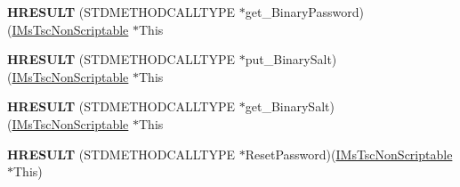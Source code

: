 \begin{DoxyCompactItemize}
{\bfseries H\+R\+E\+S\+U\+LT} (S\+T\+D\+M\+E\+T\+H\+O\+D\+C\+A\+L\+L\+T\+Y\+PE $\ast$get\+\_\+\+Binary\+Password)(\hyperlink{interface_m_s_t_s_c_lib_1_1_i_ms_tsc_non_scriptable}{I\+Ms\+Tsc\+Non\+Scriptable} $\ast$This
\item 
\mbox{\label{struct_m_s_t_s_c_lib_1_1_i_ms_tsc_non_scriptable_vtbl_aa35deec1a31aa10a48491b89ff4978c8}} 
{\bfseries H\+R\+E\+S\+U\+LT} (S\+T\+D\+M\+E\+T\+H\+O\+D\+C\+A\+L\+L\+T\+Y\+PE $\ast$put\+\_\+\+Binary\+Salt)(\hyperlink{interface_m_s_t_s_c_lib_1_1_i_ms_tsc_non_scriptable}{I\+Ms\+Tsc\+Non\+Scriptable} $\ast$This
\item 
\mbox{\label{struct_m_s_t_s_c_lib_1_1_i_ms_tsc_non_scriptable_vtbl_adf44d8f8264e909730fc579d8d1bc91b}} 
{\bfseries H\+R\+E\+S\+U\+LT} (S\+T\+D\+M\+E\+T\+H\+O\+D\+C\+A\+L\+L\+T\+Y\+PE $\ast$get\+\_\+\+Binary\+Salt)(\hyperlink{interface_m_s_t_s_c_lib_1_1_i_ms_tsc_non_scriptable}{I\+Ms\+Tsc\+Non\+Scriptable} $\ast$This
\item 
\mbox{\label{struct_m_s_t_s_c_lib_1_1_i_ms_tsc_non_scriptable_vtbl_a42759a2e5382aefe72f70948b757867b}} 
{\bfseries H\+R\+E\+S\+U\+LT} (S\+T\+D\+M\+E\+T\+H\+O\+D\+C\+A\+L\+L\+T\+Y\+PE $\ast$Reset\+Password)(\hyperlink{interface_m_s_t_s_c_lib_1_1_i_ms_tsc_non_scriptable}{I\+Ms\+Tsc\+Non\+Scriptable} $\ast$This)
\end{DoxyCompactItemize}
